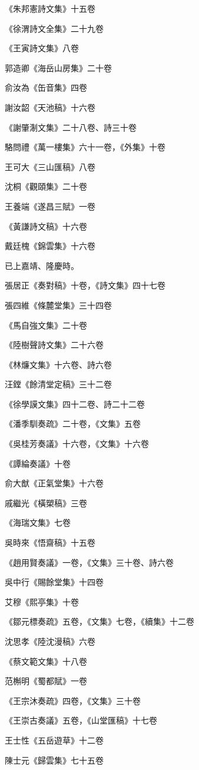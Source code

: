 《朱邦憲詩文集》十五卷

《徐渭詩文全集》二十九卷

《王寅詩文集》八卷

郭造卿《海岳山房集》二十卷

俞汝為《缶音集》四卷

謝汝韶《天池稿》十六卷

《謝肇淛文集》二十八卷、詩三十卷

駱問禮《萬一樓集》六十一卷，《外集》十卷

王可大《三山匯稿》八卷

沈桐《觀頤集》二十卷

王養端《遂昌三賦》一卷

《黃謙詩文稿》十六卷

戴廷槐《錦雲集》十六卷

已上嘉靖、隆慶時。

張居正《奏對稿》十卷，《詩文集》四十七卷

張四維《條麓堂集》三十四卷

《馬自強文集》二十卷

《陸樹聲詩文集》二十六卷

《林燫文集》十六卷、詩六卷

汪鏜《餘清堂定稿》三十二卷

《徐學謨文集》四十二卷、詩二十二卷

《潘季馴奏疏》二十卷，《文集》五卷

《吳桂芳奏議》十六卷，《文集》十六卷

《譚綸奏議》十卷

俞大猷《正氣堂集》十六卷

戚繼光《橫槊稿》三卷

《海瑞文集》七卷

吳時來《悟齋稿》十五卷

《趙用賢奏議》一卷，《文集》三十卷、詩六卷

吳中行《賜餘堂集》十四卷

艾穆《熙亭集》十卷

《鄒元標奏疏》五卷，《文集》七卷，《續集》十二卷

沈思孝《陸沈漫稿》六卷

《蔡文範文集》十八卷

范槲明《蜀都賦》一卷

《王宗沐奏疏》四卷，《文集》三十卷

《王崇古奏議》五卷，《山堂匯稿》十七卷

王士性《五岳遊草》十二卷

陳士元《歸雲集》七十五卷

